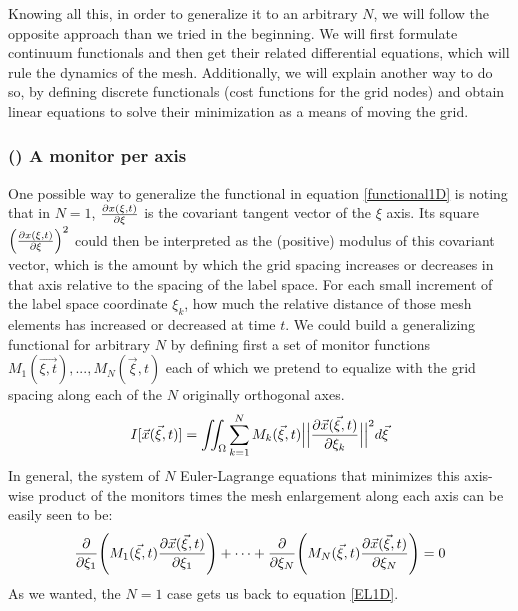 \documentclass[11pt, a4paper]{article} %
\begin{document}
Knowing all this, in order to generalize it to an arbitrary $N$, we will follow the opposite approach than we tried in the beginning. We will first formulate continuum functionals and then get their related differential equations, which will rule the dynamics of the mesh. Additionally, we will explain another way to do so, by defining discrete functionals (cost functions for the grid nodes) and obtain linear equations to solve their minimization as a means of moving the grid.\vspace{-0.3cm}

\subsubsection*{\bf (\textalpha) A monitor per axis\vspace{-0.2cm}}
One possible way to generalize the functional in equation \eqref{functional1D} is noting that in $N=1$, $\pdv{x(\xi,t)}{\xi}$ is the covariant tangent vector of the $\xi$ axis. Its square $\qty(\pdv{x(\xi,t)}{\xi})^2$ could then be interpreted as the (positive) modulus of this covariant vector, which is the amount by which the grid spacing increases or decreases in that axis relative to the spacing of the label space. For each small increment of the label space coordinate $\xi_k$, how much the relative distance of those mesh elements has increased or decreased at time $t$. We could build a generalizing functional for arbitrary $N$ by defining first a set of monitor functions $M_1(\vec{\xi,t}),...,M_N(\vec{\xi},t)$ each of which we pretend to equalize with the grid spacing along each of the $N$ originally orthogonal axes.
\begin{equation}
I[\vec{x}(\vec{\xi},t)]=\iint_\Omega \sum_{k=1}^N M_k(\vec{\xi},t) \Big|\Big|\pdv{\vec{x}(\vec{\xi},t)}{\xi_k}\Big|\Big|^2 d\vec{\xi}
\end{equation}
In general, the system of $N$ Euler-Lagrange equations that minimizes this axis-wise product of the monitors times the mesh enlargement along each axis can be easily seen to be:
\begin{equation}
\pdv{}{\xi_1} \qty( M_1(\vec{\xi},t)\pdv{\vec{x}(\vec{\xi},t)}{\xi_1} )+\cdots+\pdv{}{\xi_N}\qty( M_N(\vec{\xi},t)\pdv{\vec{x}(\vec{\xi},t)}{\xi_N} )=0
\end{equation}
As we wanted, the $N=1$ case gets us back to equation \eqref{EL1D}.
\end{document}
